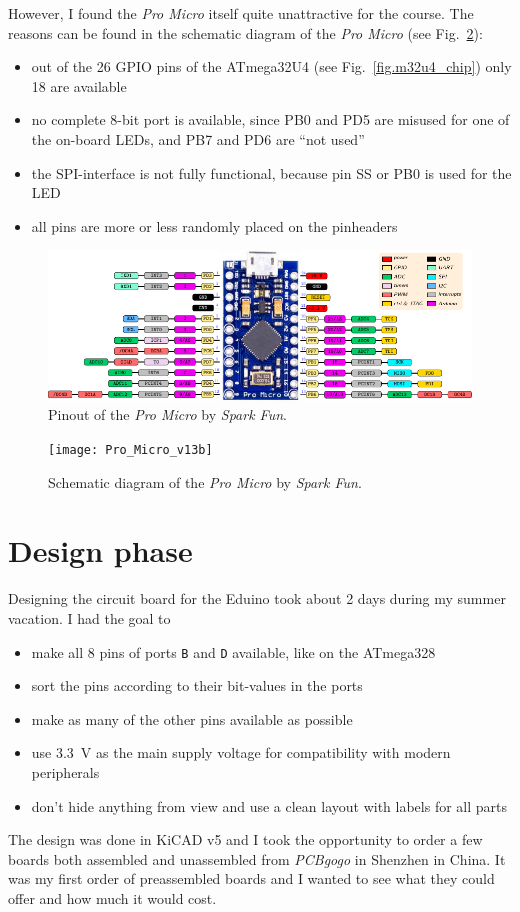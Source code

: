 \begin{multicols}{2}
However, I found the \emph{Pro Micro} itself quite unattractive for the course. The reasons
can be found in the schematic diagram of the \emph{Pro Micro} (see Fig.~\ref{fig.promicro_sch}):
\begin{itemize}\tightlist
  \item out of the 26 GPIO pins of the ATmega32U4 (see Fig.~\ref{fig.m32u4_chip}) only 18 are available
  \item no complete 8-bit port is available, since PB0 and PD5 are misused for one of the on-board LEDs, and PB7 and PD6 are ``not used''
  \item the SPI-interface is not fully functional, because pin SS or PB0 is used for the LED
  \item all pins are more or less randomly placed on the pinheaders
\end{itemize}

\begin{figure}[p]
  \centering
  \includegraphics[width=.9\textwidth]{arduino_promicro_pinout}
  \caption{Pinout of the \emph{Pro Micro} by \emph{Spark Fun}.}\label{fig.promicro}
\end{figure}

\begin{figure}[p]
  \centering
  \texttt{[image: Pro\_Micro\_v13b]}
  \caption{Schematic diagram of the \emph{Pro Micro} by \emph{Spark Fun}.}\label{fig.promicro_sch}
\end{figure}

\section{Design phase}
Designing the circuit board for the Eduino took about 2 days during my summer vacation.
I had the goal to
\begin{itemize}\tightlist
  \item make all 8 pins of ports \lstinline!B! and \lstinline!D! available, like on the ATmega328
  \item sort the pins according to their bit-values in the ports
  \item make as many of the other pins available as possible
  \item use \SI{3.3}{\volt} as the main supply voltage for compatibility with modern peripherals
  \item don't hide anything from view and use a clean layout with labels for all parts
\end{itemize}
The design was done in KiCAD v5 and I took the opportunity to order a few boards both assembled and
unassembled from \emph{PCBgogo} in Shenzhen in China. It was my first order of preassembled boards and
I wanted to see what they could offer and how much it would cost.


\end{multicols}
